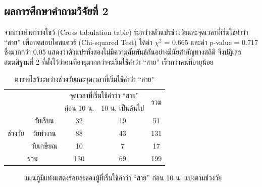 \documentclass[a4paper]{article}
\begin{document}
\subsection{ผลการศึกษาคำถามวิจัยที่ 2}
    จากการทำตารางไขว้ (Cross tabulation table) ระหว่างตัวแปรช่วงวัยและจุดเวลาที่เริ่มใช้คำว่า “สาย” เพื่อทดสอบไคสแควร์ (Chi-squared Test) ได้ค่า $\chi^2$ = 0.665 และค่า p-value = 0.717 ซึ่งมากกว่า 0.05 แสดงว่าตัวแปรทั้งสองไม่มีความสัมพันธ์กันอย่างมีนัยสำคัญทางสถิติ จึงปฏิเสธสมมติฐานที่ 2 ที่ตั้งไว้ว่าคนที่อายุมากกว่าจะเริ่มใช้คำว่า “สาย” เร็วกว่าคนที่อายุน้อย
    \begin{table}[!ht]
        \begin{center}
        \begin{tabular}{|c|c|c|c|c|}
            \cline{3-5}
            \multicolumn{2}{c|}{} & \multicolumn{2}{c|}{จุดเวลาที่เริ่มใช้คำว่า “สาย”} & \multirow{2}{*}{รวม} \\
            \cline{3-4}
            \multicolumn{2}{c|}{} & ก่อน 10 น. & 10 น. เป็นต้นไป & \\
            \hline
            \multirow{3}{*}{ช่วงวัย} & วัยเรียน & 32 & 19 & 51 \\
            \cline{2-5}
            & วัยทำงาน & 88 & 43 & 131 \\
            \cline{2-5}
            & วัยเกษียณ & 10 & 7 & 17 \\
            \hline
            \multicolumn{2}{|c|}{รวม} & 130 & 69 & 199 \\
            \hline
        \end{tabular}
        \end{center}
        \caption{ตารางไขว้ระหว่างช่วงวัยและจุดเวลาที่เริ่มใช้คำว่า “สาย”}
    \end{table}
    \begin{figure}[!ht]
        \begin{center}
        \end{center}
        \caption{แผนภูมิแท่งแสดงร้อยละของผู้ที่เริ่มใช้คำว่า “สาย” ก่อน 10 น. แบ่งตามช่วงวัย}
    \end{figure}
    \newpage
\end{document}
